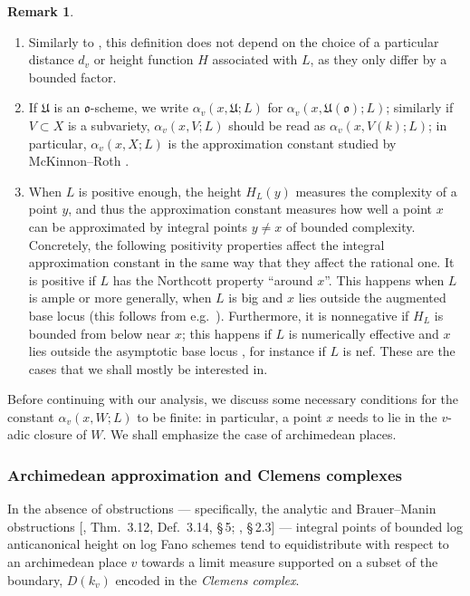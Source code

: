 \documentclass[a4paper, twoside, 11pt]{amsart}
\theoremstyle{definition}
\newtheorem{remark}[theorem]{Remark}
\newcommand{\mU}{\mathfrak{U}}
\newcommand{\fo}{\mathfrak{o}}
\begin{document}
\begin{remark}
	\begin{enumerate}[label=(\arabic*)]
		\item Similarly to \cite[Rem.~(a) after Def.~2.9]{McK-Roth}, this definition does not depend on the choice of a particular distance $d_v$ or height function $H$ associated with $L$, as they only differ by a bounded factor.
		\item If $\mU$ is an $\fo$-scheme, we write $\alpha_v(x, \mU; L)$ for $\alpha_v(x,\mU(\fo);L)$; similarly if $V\subset X$ is a subvariety, $\alpha_v(x,V;L)$ should be read as $\alpha_v(x,V(k);L)$; in particular, $\alpha_v(x,X;L)$ is the approximation constant studied by McKinnon--Roth \cite[Definition 2.9]{McK-Roth}.
		\item When $L$ is positive enough, the height $H_L(y)$ measures the complexity of a point $y$, and thus the approximation constant measures how well a point $x$ can be approximated by integral points $y\ne x$ of bounded complexity.
		Concretely, the following positivity properties affect the integral approximation constant in the same way that they affect the rational one.
		It is positive if $L$ has the Northcott property ``around $x$''. This happens when $L$ is ample \cite[Prop.~2.14~(d)]{McK-Roth} or more generally, when $L$ is big and $x$ lies outside the augmented base locus (this follows from e.g.~\cite[pf.~of~Prop.~2.12]{Peyre}). Furthermore, it is nonnegative if $H_L$ is bounded from below near $x$; this happens if $L$ is numerically effective and $x$ lies outside the asymptotic base locus \cite[Rem.~(c) after Def.~2.9]{McK-Roth}, for instance if $L$ is nef. These are the cases that we shall mostly be interested in. 
	\end{enumerate}
\end{remark}

Before continuing with our analysis, we discuss some necessary conditions for the constant $\alpha_v(x, W; L)$ to be finite: in particular, a point $x$ needs to lie in the $v$-adic closure of $W$. We shall emphasize the case of archimedean places.


\subsubsection*{Archimedean approximation and Clemens complexes} 
In the absence of obstructions --- specifically, the analytic and Brauer--Manin obstructions [, Thm.~3.12, Def.~3.14, \S\,5; , \S\,2.3] --- integral points of bounded log anticanonical height on log Fano schemes tend to equidistribute with respect to an archimedean place $v$ towards a limit measure supported on a subset of the boundary, $D(k_v)$ encoded in the \emph{Clemens complex}.
\end{document}
